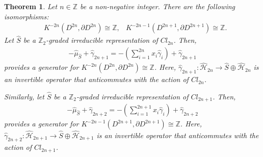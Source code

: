 \documentclass{amsart}
\newtheorem{thm}{Theorem}[section]
\theoremstyle{definition}
\theoremstyle{remark}
\begin{document}
\begin{thm}
Let $n \in \mathbb{Z}$ be a non-negative integer. There are the following isomorphisms:
\begin{align*}
&K^{-2n}(D^{2n},\partial D^{2n})\cong \mathbb{Z}, &K^{-2n-1}(D^{2n+1}, \partial D^{2n+1})\cong \mathbb{Z}.
\end{align*}
Let $\hat{S}$ be a $\mathbb{Z}_2$-graded irreducible representation of $Cl_{2n}$. Then, 
\begin{align*}
-\hat{\mu}_{\hat{S}}  + \hat{\gamma}_{2n+1}=-(\sum_{i=1}^{2n} x_i \hat{\gamma}_i) + \hat{\gamma}_{2n+1}
\end{align*}
provides a generator for $K^{-2n}(D^{2n}, \partial D^{2n}) \cong \mathbb{Z}$. Here, $\hat{\gamma}_{2n+1}\colon \hat{\mathcal{H}}_{2n} \to \hat{S} \oplus \hat{\mathcal{H}}_{2n}$ is an invertible operator that anticommutes with the action of $Cl_{2n}$.


Similarly, let $\hat{S}$ be a $\mathbb{Z}_2$-graded irreducible representation of $Cl_{2n+1}$. Then, 
\begin{align*}
-\hat{\mu}_{\hat{S}}  + \hat{\gamma}_{2n+2}=-(\sum_{i=1}^{2n+1} x_i \hat{\gamma}_i) + \hat{\gamma}_{2n+2}
\end{align*}
provides a generator for $K^{-2n-1}(D^{2n+1}, \partial D^{2n+1})\cong \mathbb{Z}$. Here, $\hat{\gamma}_{2n+2}\colon \hat{\mathcal{H}}_{2n+1} \to \hat{S} \oplus \hat{\mathcal{H}}_{2n+1}$ is an invertible operator that anticommutes with the action of $Cl_{2n+1}$.
\end{thm}
\end{document}
